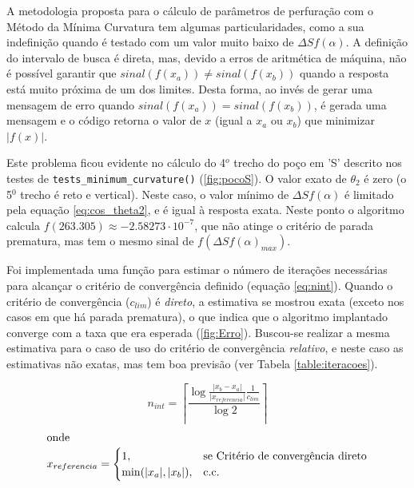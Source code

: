 \documentclass[final,3p,12pt]{elsarticle}
\begin{document}
    A metodologia proposta para o cálculo de parâmetros de perfuração com o Método da Mínima Curvatura tem algumas particularidades, como a sua indefinição quando é testado com um valor muito baixo de $\Delta S f(\alpha)$. A definição do intervalo de busca é direta, mas, devido a erros de aritmética de máquina, não é possível garantir que $sinal(f(x_a)) \neq sinal(f(x_b))$ quando a resposta está muito próxima de um dos limites. Desta forma, ao invés de gerar uma mensagem de erro quando $sinal(f(x_a)) = sinal(f(x_b))$, é gerada uma mensagem e o código retorna o valor de $x$ (igual a $x_a$ ou $x_b$) que minimizar $|f(x)|$.
    
    Este problema ficou evidente no cálculo do 4$^o$ trecho do poço em 'S' descrito nos testes de \verb|tests_minimum_curvature()| (\ref{fig:pocoS}). O valor exato de $\theta_2$ é zero (o 5$^0$ trecho é reto e vertical). Neste caso, o valor mínimo de $\Delta S f(\alpha)$ é limitado pela equação \ref{eq:cos_theta2}, e é igual à resposta exata. Neste ponto o algoritmo calcula $f(263.305) \approx -2.58273 \cdot 10^{-7}$, que não atinge o critério de parada prematura, mas tem o mesmo sinal de $f(\Delta S f(\alpha)_{max})$.

    Foi implementada uma função para estimar o número de iterações necessárias para alcançar o critério de convergência definido (equação \ref{eq:nint}). Quando o critério de convergência ($c_{lim}$) é \emph{direto}, a estimativa se mostrou exata (exceto nos casos em que há parada prematura), o que indica que o algoritmo implantado converge com a taxa que era esperada (\ref{fig:Erro}). Buscou-se realizar a mesma estimativa para o caso de uso do critério de convergência \emph{relativo}, e neste caso as estimativas não exatas, mas tem boa previsão (ver Tabela \ref{table:iteracoes}).
    
    \begin{equation} \label{eq:nint}
        n_{int} = \left \lceil \frac{\log{\frac{|x_b-x_a|}{|x_{referencia}|}\frac{1}{c_{lim}}}}{\log{2}} \right \rceil
    \end{equation}
    \begin{align*}
        \intertext{onde}
        x_{referencia} = \begin{cases}
            1,&\text{se Critério de convergência direto} \\
            \min(|x_a|,|x_b|),&\text{c.c. }  
        \end{cases}
    \end{align*}
\end{document}
